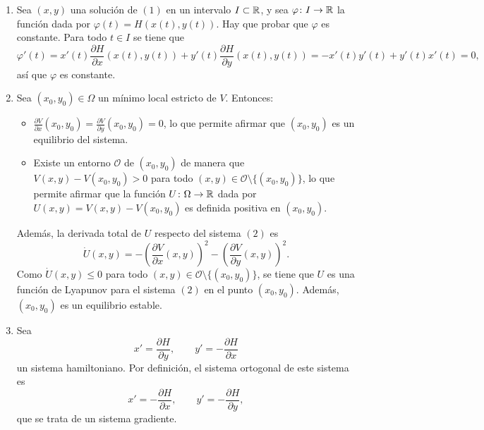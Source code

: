 \documentclass[11pt]{report}
\begin{document}
\begin{solution}
    \hfill
    \begin{enumerate}
        \item Sea $(x,y)$ una solución de $(1)$ en un intervalo $I \subset \mathbb R$, y sea $\varphi \colon I \to \mathbb R$ la función dada por $\varphi(t) = H(x(t),y(t))$. Hay que probar que $\varphi$ es constante. Para todo $t \in I$ se tiene que
        \[\varphi'(t) = x'(t)\frac{\partial H}{\partial x}(x(t),y(t))+y'(t)\frac{\partial H}{\partial y}(x(t),y(t)) = -x'(t)y'(t)+y'(t)x'(t) = 0,\]
        así que $\varphi$ es constante.
        \item Sea $(x_0,y_0) \in \Omega$ un mínimo local estricto de $V$. Entonces:
        \begin{itemize}
            \item $\frac{\partial V}{\partial x}(x_0,y_0) = \frac{\partial V}{\partial y}(x_0,y_0) = 0$, lo que permite afirmar que $(x_0,y_0)$ es un equilibrio del sistema.
            \item Existe un entorno $\mathcal{O}$ de $(x_0,y_0)$ de manera que $V(x,y)-V(x_0,y_0) > 0$ para todo $(x,y)\in \mathcal{O}\setminus\{(x_0,y_0)\}$, lo que permite afirmar que la función $U \colon \Omega \to\mathbb R$ dada por $U(x,y) = V(x,y)-V(x_0,y_0)$ es definida positiva en $(x_0,y_0)$.
        \end{itemize}  
        Además, la derivada total de $U$ respecto del sistema $(2)$ es
        \[\dot{U}(x,y) = -\left(\frac{\partial V}{\partial x}(x,y)\right)^2-\left(\frac{\partial V}{\partial y}(x,y)\right)^2.\]
        Como $\dot{U}(x,y) \leq 0$ para todo $(x,y)\in \mathcal{O}\setminus\{(x_0,y_0)\}$, se tiene que $U$ es una función de Lyapunov para el sistema $(2)$ en el punto $(x_0,y_0)$. Además, $(x_0,y_0)$ es un equilibrio estable.
        \item Sea
        \[x' = \frac{\partial H}{\partial y}, \qquad y' = -\frac{\partial H}{\partial x}\]
        un sistema hamiltoniano. Por definición, el sistema ortogonal de este sistema es
        \[x' = -\frac{\partial H}{\partial x}, \qquad y' = -\frac{\partial H}{\partial y},\]
        que se trata de un sistema gradiente.


\end{enumerate}
\end{solution}
\end{document}
